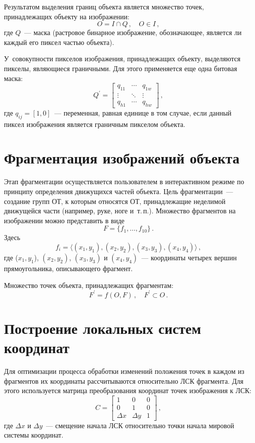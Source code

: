 \begin{multicols}{2}
  Результатом выделения границ объекта является множество точек, 
принадлежащих объекту на изображении:
  $$
  O=I\cap Q\,,\quad O\in I\,,
  $$
где $Q$~--- маска (растровое бинарное изображение, обозначающее, является 
ли каждый его пиксел \mbox{частью} объекта).
  
  У~совокупности пикселов изображения, принадлежащих объекту, 
выделяются пикселы, являющиеся граничными. Для этого применяется еще 
одна битовая маска: 
  $$
Q^\prime=\begin{bmatrix}
  q_{11} & \cdots & q_{1w}\\
  \vdots & \ddots & \vdots\\
  q_{h1} & \cdots & q_{hw}
  \end{bmatrix}\,,
  $$
где $q_{ij} = [1, 0]$~--- переменная, равная единице в том случае, если данный 
пиксел изображения является граничным пикселом объекта.

\section{Фрагментация изображений объекта}

  Этап фрагментации осуществляется пользо\-вателем в интерактивном режиме 
по принципу определения движущихся частей объекта. Цель фрагментации~--- 
создание групп ОТ, к которым относят\-ся ОТ, принадлежащие неделимой 
движущейся части (например, руке, ноге и~т.\,п.). Множество фрагментов на 
изображении можно представить в виде
  \begin{equation*}
  F=\{ f_1,\ldots , f_{10}\}\,.
  \end{equation*}
  Здесь
  $$  
   f_i=\langle (x_1,y_1), (x_2,y_2), (x_3, y_3), (x_4, 
y_4)\rangle\,,
$$
где ($x_1, y_1$), $(x_2, y_2)$, $(x_3, y_3)$ и $(x_4, y_4)$~--- координаты четырех 
вершин прямоугольника, описывающего фрагмент.

  Множество точек объекта, принадлежащих фрагментам:
  $$
  F^\prime =f(O,F)\,,\quad F^\prime\subset O\,.
  $$
  
\section{Построение локальных систем координат}

  Для оптимизации процесса обработки изменений положения точек в каждом 
из фрагментов их координаты рассчитываются относительно 
ЛСК фрагмента. Для этого используется матрица преобразования 
координат точек изображения к ЛСК:
  $$
  C=\begin{bmatrix}
  1&0&0\\
  0&1&0\\
  \Delta x & \Delta y &1
  \end{bmatrix}\,,
  $$
где $\Delta x$ и $\Delta y$~--- смещение начала ЛСК относительно точки начала 
мировой системы координат.


\end{multicols}
